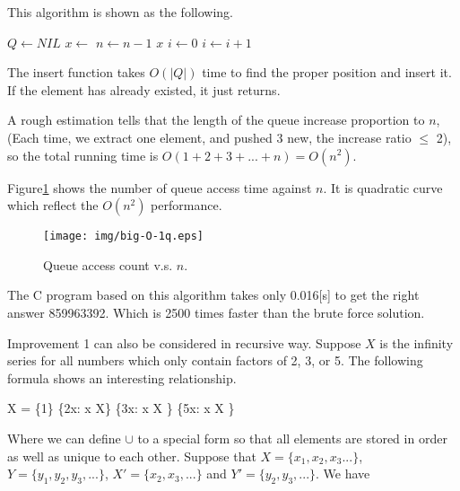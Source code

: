 \documentclass{article}
\begin{document}
This algorithm is shown as the following.

\begin{algorithmic}[1]
  \State $Q \gets NIL$
  \State {}
    \State $x \gets$ 
    \State {}
    \State {}
    \State {}
    \State $n \gets n-1$
  \EndWhile
  \State \Return $x$
\EndFunction
\Statex
{}
  \State $i \gets 0$
    \State $i \gets i + 1$
  \EndWhile
    \State \Return
  \EndIf
  \State {}
\EndFunction
\end{algorithmic}

The insert function takes $O(|Q|)$ time to find the proper position and insert
it. If the element has already existed, it just returns.

A rough estimation tells that the length of the queue increase proportion to $n$,
(Each time, we extract one element, and pushed 3 new, the increase ratio $\leq$ 2),
so the total running time is $O(1+2+3+...+n) = O(n^2)$.

Figure\ref{fig:big-O-1q} shows the number of queue access time against $n$.
It is quadratic curve which reflect the $O(n^2)$ performance.

\begin{figure}[htbp]
       \begin{center}
       	  \texttt{[image: img/big-O-1q.eps]}
        \caption{Queue access count v.s. $n$.} \label{fig:big-O-1q}
       \end{center}
\end{figure}

The C program based on this algorithm takes only 0.016[s] to get the right answer
859963392. Which is 2500 times faster than the brute force solution.

Improvement 1 can also be considered in recursive way. Suppose $X$ is the infinity
series for all numbers which only contain factors of 2, 3, or 5. The following
formula shows an interesting relationship.

\be
  X = \{1\} \cup \{2x: \forall x \in X\} \cup \{3x: \forall x \in X \} \cup \{5x: \forall x \in X \}
\ee

Where we can define $\cup$ to a special form so that all elements are stored in order
as well as unique to each other. Suppose that $X=\{x_1, x_2, x_3...\}$, $Y=\{y_1, y_2, y_3, ...\}$, $X' = \{x_2, x_3, ...\}$ and $Y'=\{y_2, y_3, ...\}$. We have
\end{document}
